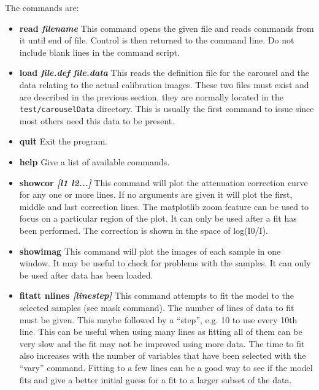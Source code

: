 \documentclass[a4paper,12pt]{article}
\begin{document}
The commands are:
\begin{itemize}
\item{\bf read \it{filename}} This command opens the given file and reads commands from it until end of file.
Control is then returned to the command line. Do not include blank lines in the command script.

\item{\bf load \it{file.def} \it{file.data}} This reads the definition file for the carousel and the data
relating to the actual calibration images. These two files must exist and are described in the previous section.
they are normally located in the \texttt{test/carouselData} directory.
This is usually the first command to issue since most others need this data to be present.

\item{\bf quit} Exit the program.

\item{\bf help} Give a list of available commands.

\item{\bf showcor \it{[l1 l2...]}} This command will plot the attenuation correction curve for any one or more lines. If no arguments are given
it will plot the first, middle and last correction lines. The matplotlib zoom feature can be used to focus on a particular region of the
plot. It can only be used after a fit has been performed.
The correction is shown in the space of log(I0/I).

\item{\bf showimag} This command will plot the images of each sample in one window. It may be useful to check for problems with the samples.
It can only be used after data has been loaded.

\item{\bf fitatt nlines \it{[linestep]}} This command attempts to fit the model to the selected samples (see mask command). The
number of lines of data to fit must be given. This maybe followed by a ``step'', e.g. 10 to use every 10th line.
This can be useful when using many lines as fitting all of them can be very slow and the
fit may not be improved using more data.
The time to fit also increases with the number of variables that have been selected with the ``vary'' command.
Fitting to a few lines can be a good way to see if the model fits and give a better initial guess for a fit
to a larger subset of the data.



\end{itemize}
\end{document}
